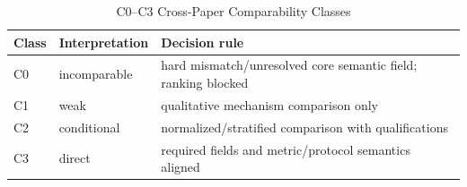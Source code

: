 \begin{table}[H]\centering\caption{C0--C3 Cross-Paper Comparability Classes}\label{tab:cclasses}\scriptsize\begin{tabularx}{\columnwidth}{p{}p{}Y}\toprule Class & Interpretation & Decision rule\\\midrule C0 & incomparable & hard mismatch/unresolved core semantic field; ranking blocked\\ C1 & weak & qualitative mechanism comparison only\\ C2 & conditional & normalized/stratified comparison with qualifications\\ C3 & direct & required fields and metric/protocol semantics aligned\\\bottomrule\end{tabularx}\end{table}